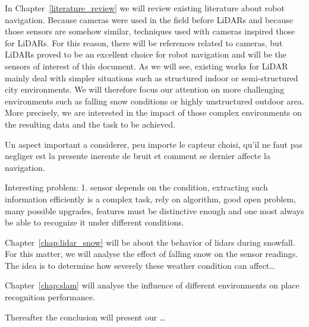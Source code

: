 In Chapter~\ref{literature_review} we will review existing literature about robot navigation. Because cameras were used in the field before LiDARs and because those sensors are somehow similar, techniques used with cameras inspired those for LiDARs. For this reason, there will be references related to cameras, but LiDARs proved to be an excellent choice for robot navigation and will be the sensors of interest of this document. As we will see, existing works for LiDAR mainly deal with simpler situations such as structured indoor or semi-structured city environments. We will therefore focus our attention on more challenging environments such as falling snow conditions or highly unstructured outdoor area. More precisely, we are interested in the impact of those complex environments on the resulting data and the task to be achieved.

Un aspect important a considerer, peu importe le capteur choisi, qu'il ne faut pas negliger est la presente inerente de bruit et comment se dernier affecte la navigation. 

Interesting problem: 1. sensor depends on the condition, extracting such information efficiently is a complex task, rely on algorithm, good open problem, many possible upgrades, features must be distinctive enough and one most always be able to recognize it under different conditions. 

Chapter~\ref{chap:lidar_snow} will be about the behavior of \gls*{lidar}s during snowfall. For this matter, we will analyse the effect of falling snow on the sensor readings. The idea is to determine how severely these weather condition can affect\dots 

Chapter~\ref{chap:slam} will analyse the influence of different environments on place recognition performance.

Thereafter the conclusion will present our \dots
